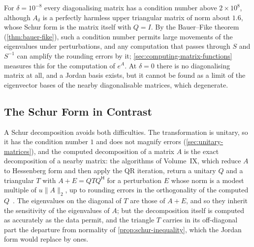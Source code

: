 For $\delta=10^{-8}$ every diagonalising matrix has a condition number above $2\times10^8$, although $A_\delta$ is a perfectly harmless upper triangular matrix of norm about $1.6$, whose Schur form is the matrix itself with $Q=I$. By the Bauer--Fike theorem (\cref{thm:bauer-fike}), such a condition number permits large movements of the eigenvalues under perturbations, and any computation that passes through $S$ and $S^{-1}$ can amplify the rounding errors by it; \cref{sec:computing-matrix-functions} measures this for the computation of $e^{A}$. At $\delta=0$ there is no diagonalising matrix at all, and a Jordan basis exists, but it cannot be found as a limit of the eigenvector bases of the nearby diagonalisable matrices, which degenerate.

\subsection{The Schur Form in Contrast}

A Schur decomposition avoids both difficulties. The transformation is unitary, so it has the condition number $1$ and does not magnify errors (\cref{sec:unitary-matrices}), and the computed decomposition of a matrix $A$ is the exact decomposition of a nearby matrix: the algorithms of Volume~IX, which reduce $A$ to Hessenberg form and then apply the QR iteration, return a unitary $Q$ and a triangular $T$ with $A+E=QTQ^{\mathsf H}$ for a perturbation $E$ whose norm is a modest multiple of $u\|A\|_2$, up to rounding errors in the orthogonality of the computed $Q$~\cite[Sect.~7.5]{golub2013}. The eigenvalues on the diagonal of $T$ are those of $A+E$, and so they inherit the sensitivity of the eigenvalues of $A$; but the decomposition itself is computed as accurately as the data permit, and the triangle $T$ carries in its off-diagonal part the departure from normality of \cref{prop:schur-inequality}, which the Jordan form would replace by ones.

